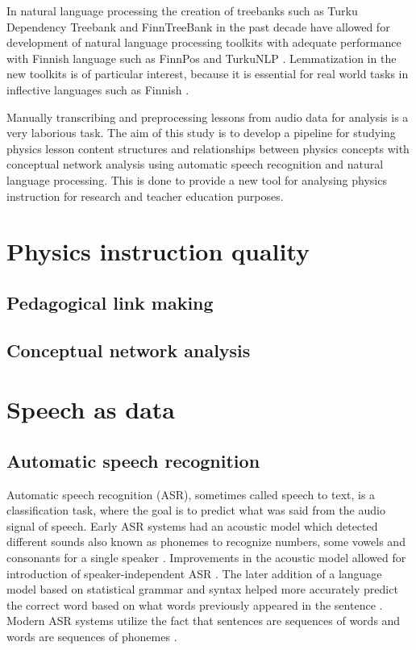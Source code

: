 \documentclass[utf8,english]{gradu3}
\begin{document}
In natural language processing the creation of treebanks such as Turku Dependency Treebank and FinnTreeBank in the past decade have allowed for development of natural language processing toolkits with adequate performance with Finnish language such as FinnPos \parencite{silfverberg2016finnpos} and TurkuNLP \parencite{kanerva2018turku}. Lemmatization in the new toolkits is of particular interest, because it is essential for real world tasks in inflective languages such as Finnish \parencite{kanerva2018turku}.

Manually transcribing and preprocessing lessons from audio data for analysis is a very laborious task. The aim of this study is to develop a pipeline for studying physics lesson content structures and relationships between physics concepts with conceptual network analysis using automatic speech recognition and natural language processing. This is done to provide a new tool for analysing physics instruction for research and teacher education purposes. 

\chapter{Physics instruction quality}

\section{Pedagogical link making}

\section{Conceptual network analysis}

\chapter{Speech as data}

\section{Automatic speech recognition}
Automatic speech recognition (ASR), sometimes called speech to text, is a classification task, where the goal is to predict what was said from the audio signal of speech. Early ASR systems had an acoustic model which detected different sounds also known as phonemes to recognize numbers, some vowels and consonants for a single speaker \parencite{juang2005automatic}. Improvements in the acoustic model allowed for introduction of speaker-independent ASR \parencite{benzeghiba2007automatic,juang2005automatic}. The later addition of a language model based on statistical grammar and syntax helped more accurately predict the correct word based on what words previously appeared in the sentence \parencite{juang2005automatic}. Modern ASR systems utilize the fact that sentences are sequences of words and words are sequences of phonemes \parencite{bengio2014word}. 
\end{document}
